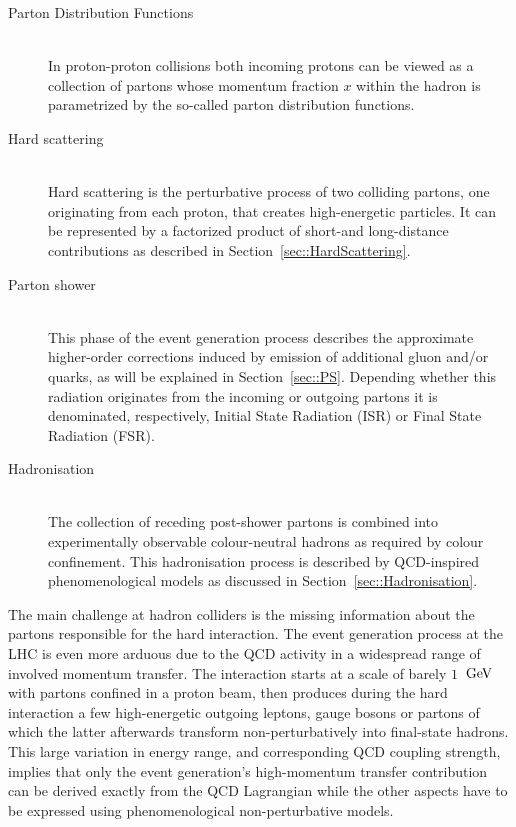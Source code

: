 \begin{myindentpar}
  \begin{description}
    \item[Parton Distribution Functions] \hfill \\
      In proton-proton collisions both incoming protons can be viewed as a collection of partons whose momentum fraction $x$ within the hadron is parametrized by the so-called parton distribution functions.
    \item[Hard scattering] \hfill \\
      Hard scattering is the perturbative process of two colliding partons, one originating from each proton, that creates high-energetic particles. It can be represented by a factorized product of short-and long-distance contributions as described in Section~\ref{sec::HardScattering}.
    \item[Parton shower] \hfill \\
      This phase of the event generation process describes the approximate higher-order corrections induced by emission of additional gluon and/or quarks, as will be explained in Section~\ref{sec::PS}. Depending whether this radiation originates from the incoming or outgoing partons it is denominated, respectively, Initial State Radiation (ISR) or Final State Radiation (FSR).
    \item[Hadronisation] \hfill \\
      The collection of receding post-shower partons is combined into experimentally observable colour-neutral hadrons as required by colour confinement. This hadronisation process is described by QCD-inspired phenomenological models as discussed in Section~\ref{sec::Hadronisation}.
  \end{description}
\end{myindentpar}

The main challenge at hadron colliders is the missing information about the partons responsible for the hard interaction. 
The event generation process at the LHC is even more arduous due to the QCD activity in a widespread range of involved momentum transfer. %
The interaction starts at a scale of barely $1$ $\, \mathrm{GeV}$ with partons confined in a proton beam, then produces during the hard interaction a few high-energetic outgoing leptons, gauge bosons or partons of which the latter afterwards transform non-perturbatively into final-state hadrons. This large variation in energy range, and corresponding QCD coupling strength, implies that only the event generation's high-momentum transfer contribution can be derived exactly from the QCD Lagrangian while the other aspects have to be expressed using phenomenological non-perturbative models.


